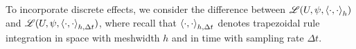 \documentclass[english,reqno]{amsart}
\begin{document}


To incorporate discrete effects, we consider the difference between $\mathscr{L}(U,\psi,\left\langle\cdot,\cdot\right\rangle_h)$ and $\mathscr{L}(U,\psi,\left\langle\cdot,\cdot\right\rangle_{h,\Delta t})$, where recall that $\left\langle\cdot,\cdot\right\rangle_{h,\Delta t}$ denotes trapezoidal rule integration in space with meshwidth $h$ and in time with sampling rate $\Delta t$.

\end{document}
